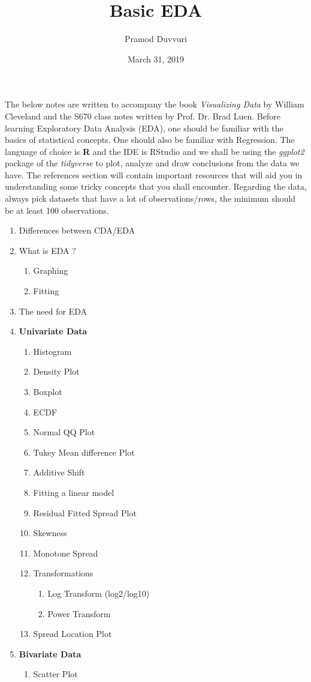 \documentclass[11pt]{article}
\title{Basic EDA}
\author{Pramod Duvvuri}
\date{March 31, 2019}
\begin{document}
	\maketitle
	The below notes are written to accompany the book \textit{Visualizing Data} by William Cleveland and the S670 class notes written by Prof. Dr. Brad Luen. Before learning Exploratory Data Analysis (EDA), one should be familiar with the basics of statistical concepts. One should also be familiar with Regression. The language of choice is \textbf{R} and the IDE is RStudio and we shall be using the \textit{ggplot2} package of the \textit{tidyverse} to plot, analyze and draw conclusions from the data we have. The references section will contain important resources that will aid you in understanding some tricky concepts that you shall encounter. Regarding the data, always pick datasets that have a lot of observations/rows, the minimum should be at least 100 observations.
	\begin{enumerate}
		\item Differences between CDA/EDA
		\item What is EDA ?
		\begin{enumerate}
			\item Graphing
			\item Fitting
		\end{enumerate}
	    \item The need for EDA
		\item \textbf{Univariate Data}
		\begin{enumerate}
			\item Histogram
			\item Density Plot
			\item Boxplot
			\item ECDF
			\item Normal QQ Plot
			\item Tukey Mean difference Plot
			\item Additive Shift
			\item Fitting a linear model
			\item Residual Fitted Spread Plot
			\item Skewness
			\item Monotone Spread
			\item Transformations
			\begin{enumerate}
				\item Log Transform (log2/log10)
				\item Power Transform
			\end{enumerate}
		\item Spread Location Plot
		\end{enumerate}
	\item \textbf{Bivariate Data}
	\begin{enumerate}
		\item Scatter Plot
	\end{enumerate}
	\end{enumerate}
\newpage
\end{document}
